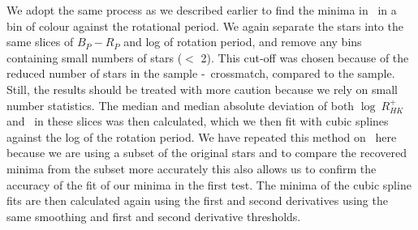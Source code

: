 We adopt the same process as we described earlier to find the minima in \rper{} \ in a bin of colour against the rotational period.
We again separate the stars into the same slices of $B_P-R_P$ and log of rotation period, and remove any bins containing small numbers of stars ($<$ 2).
This cut-off was chosen because of the reduced number of stars in the sample \kepler-\lamost\ crossmatch, compared to the \citet{mcquillan_rotation_2014} sample.
 Still, the results should be treated with more caution because we rely on small number statistics.
The median and median absolute deviation of both $\log \ R^{+}_{HK}$ and \rper{} \ in these slices was then calculated, which we then fit with cubic splines against the log of the rotation period.
We have repeated this method on \rper{} \ here because we are using a subset of the original stars and to compare the recovered minima from the subset more accurately this also allows us to confirm the accuracy of the fit of our minima in the first test.
The minima of the cubic spline fits are then calculated again using the first and second derivatives using the same smoothing and first and second derivative thresholds.

